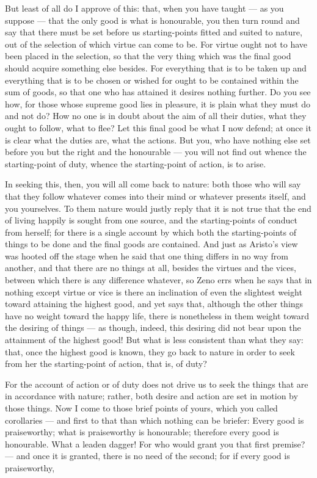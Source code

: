  But least of all do I approve of this: that, when you have taught — as you suppose — that the only good is what is honourable, you then turn round and say that there must be set before us starting-points fitted and suited to nature, out of the selection of which virtue can come to be. For virtue ought not to have been placed in the selection, so that the very thing which was the final good should acquire something else besides. For everything that is to be taken up and everything that is to be chosen or wished for ought to be contained within the sum of goods, so that one who has attained it desires nothing further. Do you see how, for those whose supreme good lies in pleasure, it is plain what they must do and not do? How no one is in doubt about the aim of all their duties, what they ought to follow, what to flee? Let this final good be what I now defend; at once it is clear what the duties are, what the actions. But you, who have nothing else set before you but the right and the honourable — you will not find out whence the starting-point of duty, whence the starting-point of action, is to arise.

 In seeking this, then, you will all come back to nature: both those who will say that they follow whatever comes into their mind or whatever presents itself, and you yourselves. To them nature would justly reply that it is not true that the end of living happily is sought from one source, and the starting-points of conduct from herself; for there is a single account by which both the starting-points of things to be done and the final goods are contained. And just as Aristo's view was hooted off the stage when he said that one thing differs in no way from another, and that there are no things at all, besides the virtues and the vices, between which there is any difference whatever, so Zeno errs when he says that in nothing except virtue or vice is there an inclination of even the slightest weight toward attaining the highest good, and yet says that, although the other things have no weight toward the happy life, there is nonetheless in them weight toward the desiring of things — as though, indeed, this desiring did not bear upon the attainment of the highest good! But what is less consistent than what they say: that, once the highest good is known, they go back to nature in order to seek from her the starting-point of action, that is, of duty?

 For the account of action or of duty does not drive us to seek the things that are in accordance with nature; rather, both desire and action are set in motion by those things. Now I come to those brief points of yours, which you called corollaries — and first to that than which nothing can be briefer: Every good is praiseworthy; what is praiseworthy is honourable; therefore every good is honourable. What a leaden dagger! For who would grant you that first premise? — and once it is granted, there is no need of the second; for if every good is praiseworthy,

